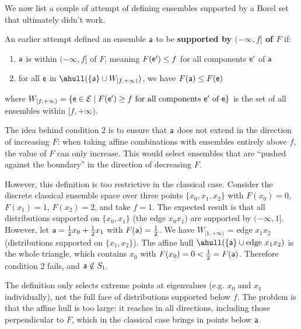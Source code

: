We now list a couple of attempt of defining ensembles supported by a Borel set that ultimately didn't work.

	\begin{remark}
		An earlier attempt defined an ensemble $\ens[a]$ to be \textbf{supported by $(-\infty, f]$ of $F$} if:
		\begin{enumerate}
			\item $\ens[a]$ is within $(-\infty, f]$ of $F$, meaning $F(\ens') \leq f$ for all components $\ens'$ of $\ens[a]$
			\item for all $\ens$ in $\ahull(\{\ens[a]\} \cup W_{[f, +\infty)})$, we have $F(\ens[a]) \leq F(\ens)$
		\end{enumerate}
		where $W_{[f, +\infty)} = \{\ens \in \Ens \mid F(\ens') \geq f \text{ for all components } \ens' \text{ of } \ens\}$ is the set of all ensembles within $[f, +\infty)$.
		
		The idea behind condition 2 is to ensure that $\ens[a]$ does not extend in the direction of increasing $F$: when taking affine combinations with ensembles entirely above $f$, the value of $F$ can only increase. This would select ensembles that are ``pushed against the boundary'' in the direction of decreasing $F$.
		
		However, this definition is too restrictive in the classical case. Consider the discrete classical ensemble space over three points $\{x_0, x_1, x_2\}$ with $F(x_0) = 0$, $F(x_1) = 1$, $F(x_2) = 2$, and take $f = 1$. The expected result is that all distributions supported on $\{x_0, x_1\}$ (the edge $x_0 x_1$) are supported by $(-\infty, 1]$. However, let $\ens[a] = \frac{1}{2}x_0 + \frac{1}{2}x_1$ with $F(\ens[a]) = \frac{1}{2}$. We have $W_{[1, +\infty)}$ = edge $x_1 x_2$ (distributions supported on $\{x_1, x_2\}$). The affine hull $\ahull(\{\ens[a]\} \cup \text{edge } x_1 x_2)$ is the whole triangle, which contains $x_0$ with $F(x_0) = 0 < \frac{1}{2} = F(\ens[a])$. Therefore condition 2 fails, and $\ens[a] \notin S_1$.
		
		The definition only selects extreme points at eigenvalues (e.g. $x_0$ and $x_1$ individually), not the full face of distributions supported below $f$. The problem is that the affine hull is too large: it reaches in all directions, including those perpendicular to $F$, which in the classical case brings in points below $\ens[a]$.
	\end{remark}

